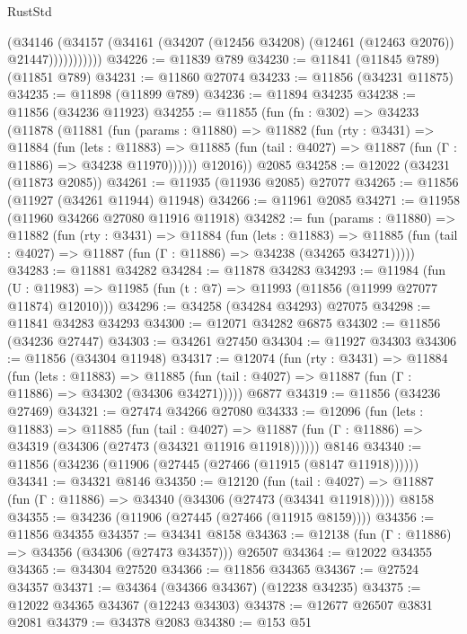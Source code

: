 \begin{lexlean}{RustStd}
\begin{coremodule}
                  (@34146
                    (@34157
                      (@34161 (@34207 (@12456 @34208) (@12461 (@12463 @2076)) @21447)))))))))))
@34226 := @11839 @789
@34230 := @11841 (@11845 @789) (@11851 @789)
@34231 := @11860 @27074
@34233 := @11856 (@34231 @11875)
@34235 := @11898 (@11899 @789)
@34236 := @11894 @34235
@34238 := @11856 (@34236 @11923)
@34255 := @11855
    (fun (fn : @302) =>
    @34233
      (@11878
        (@11881
          (fun (params : @11880) =>
          @11882
            (fun (rty : @3431) =>
            @11884
              (fun (lets : @11883) =>
              @11885 (fun (tail : @4027) => @11887 (fun (Γ : @11886) => @34238 @11970))))))
        @12016))
    @2085
@34258 := @12022 (@34231 (@11873 @2085))
@34261 := @11935 (@11936 @2085) @27077
@34265 := @11856 (@11927 (@34261 @11944) @11948)
@34266 := @11961 @2085
@34271 := @11958 (@11960 @34266 @27080 @11916 @11918)
@34282 := fun (params : @11880) =>
  @11882
    (fun (rty : @3431) =>
    @11884
      (fun (lets : @11883) =>
      @11885 (fun (tail : @4027) => @11887 (fun (Γ : @11886) => @34238 (@34265 @34271)))))
@34283 := @11881 @34282
@34284 := @11878 @34283
@34293 := @11984
    (fun (U : @11983) => @11985 (fun (t : @7) => @11993 (@11856 (@11999 @27077 @11874) @12010)))
@34296 := @34258 (@34284 @34293) @27075
@34298 := @11841 @34283 @34293
@34300 := @12071 @34282 @6875
@34302 := @11856 (@34236 @27447)
@34303 := @34261 @27450
@34304 := @11927 @34303
@34306 := @11856 (@34304 @11948)
@34317 := @12074
    (fun (rty : @3431) =>
    @11884
      (fun (lets : @11883) =>
      @11885 (fun (tail : @4027) => @11887 (fun (Γ : @11886) => @34302 (@34306 @34271)))))
    @6877
@34319 := @11856 (@34236 @27469)
@34321 := @27474 @34266 @27080
@34333 := @12096
    (fun (lets : @11883) =>
    @11885
      (fun (tail : @4027) =>
      @11887 (fun (Γ : @11886) => @34319 (@34306 (@27473 (@34321 @11916 @11918))))))
    @8146
@34340 := @11856 (@34236 (@11906 (@27445 (@27466 (@11915 (@8147 @11918))))))
@34341 := @34321 @8146
@34350 := @12120
    (fun (tail : @4027) => @11887 (fun (Γ : @11886) => @34340 (@34306 (@27473 (@34341 @11918)))))
    @8158
@34355 := @34236 (@11906 (@27445 (@27466 (@11915 @8159))))
@34356 := @11856 @34355
@34357 := @34341 @8158
@34363 := @12138 (fun (Γ : @11886) => @34356 (@34306 (@27473 @34357))) @26507
@34364 := @12022 @34355
@34365 := @34304 @27520
@34366 := @11856 @34365
@34367 := @27524 @34357
@34371 := @34364 (@34366 @34367) (@12238 @34235)
@34375 := @12022 @34365 @34367 (@12243 @34303)
@34378 := @12677 @26507 @3831 @2081
@34379 := @34378 @2083
@34380 := @153 @51

\end{coremodule}
\end{lexlean}
